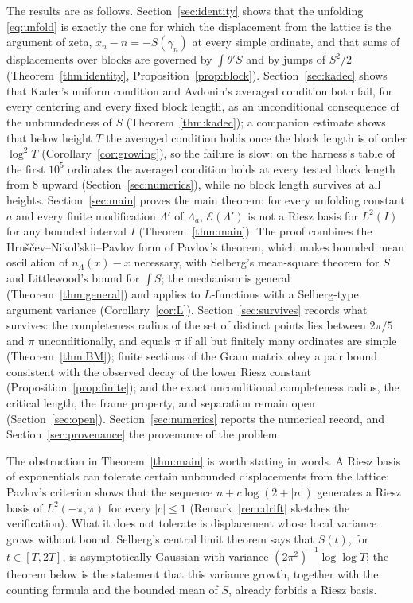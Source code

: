 \documentclass[11pt]{article}
\newcommand{\Lam}{\Lambda}
\newcommand{\E}{\mathcal{E}}
\begin{document}
The results are as follows. Section~\ref{sec:identity} shows that the unfolding \eqref{eq:unfold} is exactly the one for which the displacement from the lattice is the argument of zeta, $x_n-n=-S(\gamma_n)$ at every simple ordinate, and that sums of displacements over blocks are governed by $\int\theta' S$ and by jumps of $S^2/2$ (Theorem~\ref{thm:identity}, Proposition~\ref{prop:block}). Section~\ref{sec:kadec} shows that Kadec's uniform condition and Avdonin's averaged condition both fail, for every centering and every fixed block length, as an unconditional consequence of the unboundedness of $S$ (Theorem~\ref{thm:kadec}); a companion estimate shows that below height $T$ the averaged condition holds once the block length is of order $\log^2 T$ (Corollary~\ref{cor:growing}), so the failure is slow: on the harness's table of the first $10^5$ ordinates the averaged condition holds at every tested block length from $8$ upward (Section~\ref{sec:numerics}), while no block length survives at all heights. Section~\ref{sec:main} proves the main theorem: for every unfolding constant $a$ and every finite modification $\Lam'$ of $\Lam_a$, $\E(\Lam')$ is not a Riesz basis for $L^2(I)$ for any bounded interval $I$ (Theorem~\ref{thm:main}). The proof combines the Hru\v{s}\v{c}ev--Nikol'skii--Pavlov form of Pavlov's theorem, which makes bounded mean oscillation of $n_\Lam(x)-x$ necessary, with Selberg's mean-square theorem for $S$ and Littlewood's bound for $\int S$; the mechanism is general (Theorem~\ref{thm:general}) and applies to $L$-functions with a Selberg-type argument variance (Corollary~\ref{cor:L}). Section~\ref{sec:survives} records what survives: the completeness radius of the set of distinct points lies between $2\pi/5$ and $\pi$ unconditionally, and equals $\pi$ if all but finitely many ordinates are simple (Theorem~\ref{thm:BM}); finite sections of the Gram matrix obey a pair bound consistent with the observed decay of the lower Riesz constant (Proposition~\ref{prop:finite}); and the exact unconditional completeness radius, the critical length, the frame property, and separation remain open (Section~\ref{sec:open}). Section~\ref{sec:numerics} reports the numerical record, and Section~\ref{sec:provenance} the provenance of the problem.

The obstruction in Theorem~\ref{thm:main} is worth stating in words. A Riesz basis of exponentials can tolerate certain unbounded displacements from the lattice: Pavlov's criterion shows that the sequence $n+c\log(2+|n|)$ generates a Riesz basis of $L^2(-\pi,\pi)$ for every $|c|\le1$ (Remark~\ref{rem:drift} sketches the verification). What it does not tolerate is displacement whose local variance grows without bound. Selberg's central limit theorem says that $S(t)$, for $t\in[T,2T]$, is asymptotically Gaussian with variance $(2\pi^2)^{-1}\log\log T$; the theorem below is the statement that this variance growth, together with the counting formula and the bounded mean of $S$, already forbids a Riesz basis.
\end{document}
